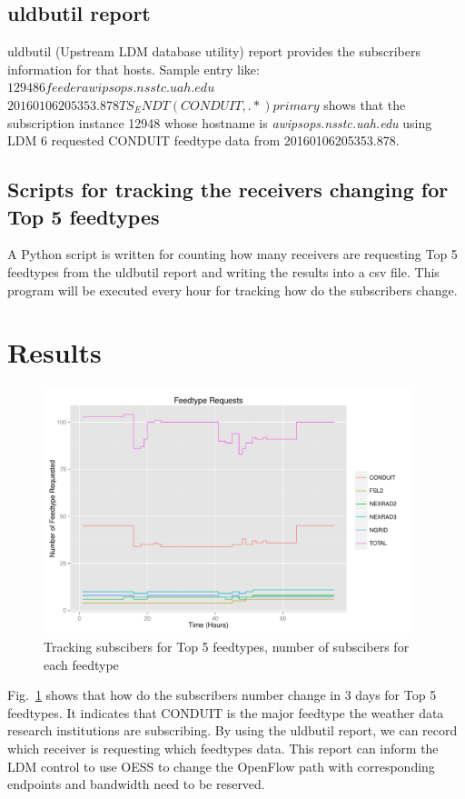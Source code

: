 \subsection{uldbutil report}
uldbutil (Upstream LDM database utility) report provides the subscribers information for that hosts. Sample entry like: $12948 6 feeder awipsops.nsstc.uah.edu$ $20160106205353.878 TS_ENDT (CONDUIT,  .*) primary$ shows that the subscription instance 12948 whose hostname is \emph{awipsops.nsstc.uah.edu} using LDM 6 requested CONDUIT feedtype data from 20160106205353.878.

\subsection{Scripts for tracking the receivers changing for Top 5 feedtypes}
A Python script is written for counting how many receivers are requesting Top 5 feedtypes from the uldbutil report and writing the results into a csv file. This program will be executed every hour for tracking how do the subscribers change.

\section{Results}
\begin{figure}[htb!]
\centering 
\includegraphics[width=0.96\textwidth]{figures/uldb_track.pdf}
\caption{Tracking subscibers for Top 5 feedtypes, number of subscibers for each feedtype}
\label{fig:uldb}
\end{figure}

Fig.~\ref{fig:uldb} shows that how do the subscribers number change in 3 days for Top 5 feedtypes. It indicates that CONDUIT is the major feedtype the weather data research institutions are subscribing. By using the uldbutil report, we can record which receiver is requesting which feedtypes data. This report can inform the LDM control to use OESS to change the OpenFlow path with corresponding endpoints and bandwidth need to be reserved.  




